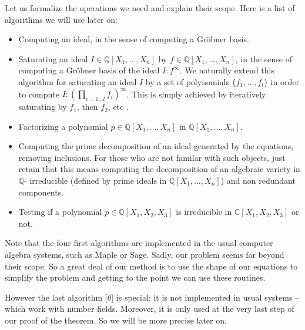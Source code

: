 Let us formalize the operations we need and explain their scope. Here is a list of algorithms we will use later on:
\begin{itemize}
  \item [$\alpha$] Computing an ideal, in the sense of computing a Gröbner basis.
  
  \item [$\beta$] Saturating an ideal $I \in \mathbb{Q} [ X_{1} , \ldots
  ,X_{n} ]$ by  $f \in \mathbb{Q} [ X_{1} , \ldots ,X_{n}
  ]$, in the sense of computing a Gröbner basis of the ideal $I:f^{\infty}$. We
  naturally extend this algorithm for saturating an ideal $I$ by a set of
  polynomials $\{ f_{1} , \ldots ,f_{l} \}$ in order to compute $I:
  \left( \prod_{i=1 \ldots l} f_{i} \right)^{\infty}$. This is simply achieved by iteratively 
  saturating by $f_1$, then $f_2$, etc \cite[Ch. 4, prop. 10]{CLO1997}.
  
  \item [$\gamma$] Factorizing a polynomial $p \in \mathbb{Q} [ X_{1} ,
  \ldots ,X_{n} ]$ in $\mathbb{Q} [ X_{1} , \ldots ,X_{n} ]$.
  

  \item [$\eta$]  Computing the prime decomposition of an ideal generated by the
  equations, removing inclusions. For those who are not familar with such
  objects, just retain that this means computing the decomposition of an
  algebraic variety in $\mathbb{Q}$- irreducible  (defined by prime
  ideals in $\mathbb{Q} [ X_{1} , \ldots ,X_{n} ]$) and non redundant
  components.
  
  \item [$\theta$]  Testing if a polynomial $p \in \mathbb{Q} [ X_{1} ,X_{2}
  ,X_{3} ]$ is irreducible in $\mathbb{C} [ X_{1} ,X_{2} ,X_{3} ]$ or not.
\end{itemize}
 
Note that the four first algorithms are implemented in the usual computer algebra systems, such 
as Maple or Sage. Sadly, our problem seems far beyond their scope. So a great deal of our 
method is to use the shape of our equations to simplify the problem and getting to the point we can use these routines.

However the last algorithm [$\theta$] is special: it is not implemented in usual systems -- which 
work with number fields. Moreover, it is only used at the very last step of our proof of the 
theorem. So we will be more precise later on.
 

